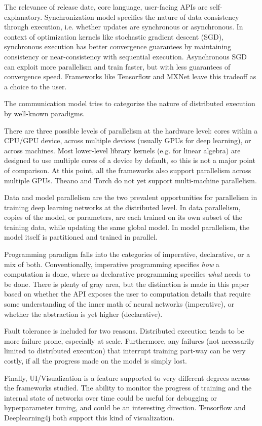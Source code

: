 The relevance of release date, core language, user-facing APIs are self-explanatory. Synchronization model specifies the nature of data consistency through execution, i.e. whether updates are synchronous or asynchronous. In context of optimization kernels like stochastic gradient descent (SGD), synchronous execution has better convergence guarantees by maintaining consistency or near-consistency with sequential execution. Asynchronous SGD can exploit more parallelism and train faster, but with less guarantees of convergence speed. Frameworks like Tensorflow and MXNet leave this tradeoff as a choice to the user. 

The communication model tries to categorize the nature of distributed execution by well-known paradigms. 

There are three possible levels of parallelism at the hardware level: cores within a CPU/GPU device, across multiple devices (usually GPUs for deep learning), or across machines. Most lower-level library kernels (e.g. for linear algebra) are designed to use multiple cores of a device by default, so this is not a major point of comparison. At this point, all the frameworks also support parallelism across multiple GPUs. Theano and Torch do not yet support multi-machine parallelism. 

Data and model parallelism are the two prevalent opportunities for parallelism in training deep learning networks at the distributed level. In data parallelism, copies of the model, or parameters, are each trained on its own subset of the training data, while updating the same global model. In model parallelism, the model itself is partitioned and trained in parallel. 

Programming paradigm falls into the categories of imperative, declarative, or a mix of both. Conventionally, imperative programming specifies \textit{how} a computation is done, where as declarative programming specifies \textit{what} needs to be done. There is plenty of gray area, but the distinction is made in this paper based on whether the API exposes the user to computation details that require some understanding of the inner math of neural networks (imperative), or whether the abstraction is yet higher (declarative). 

Fault tolerance is included for two reasons. Distributed execution tends to be more failure prone, especially at scale. Furthermore, any failures (not necessarily limited to distributed execution) that interrupt training part-way can be very costly, if all the progress made on the model is simply lost. 

Finally, UI/Visualization is a feature supported to very different degrees across the frameworks studied. The ability to monitor the progress of training and the internal state of networks over time could be useful for debugging or hyperparameter tuning, and could be an interesting direction. Tensorflow and Deeplearning4j both support this kind of visualization. 
